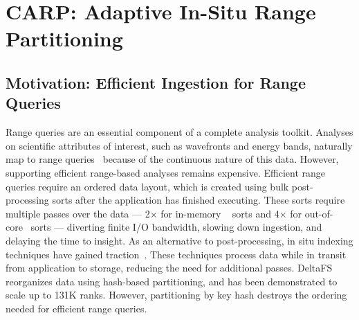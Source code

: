 \chapter{CARP: Adaptive In-Situ Range Partitioning}
\label{chap:carp}
\minitoc

\section{Motivation: Efficient Ingestion for Range Queries}

Range queries are an essential component of a complete analysis toolkit.
Analyses on scientific attributes of interest, such as wavefronts and energy bands, naturally map
to range queries~\cite{Byna2012} because of the continuous nature of this data.
However, supporting efficient range-based analyses remains expensive.
Efficient range queries require an ordered data layout, which is created using bulk post-processing
sorts after the application has finished executing.
These sorts require multiple passes over the data --- 2$\times$ for in-memory
~\cite{Sunda2013:HykSort,Dong2016} sorts and 4$\times$ for out-of-core~\cite{Rasmu2011:TritonSort}
sorts --- diverting finite I/O bandwidth, slowing down ingestion, and delaying the time to insight.
As an alternative to post-processing, in situ indexing techniques have gained
traction~\cite{Bauer2016:SituMethodsInfrastructures}.
These techniques process data while in transit from application to storage, reducing the need for
additional passes.
DeltaFS~\cite{Zheng2018:DeltaFS} reorganizes data using hash-based partitioning, and has been
demonstrated to scale up to 131K ranks.
However, partitioning by key hash destroys the ordering needed for efficient range queries.


